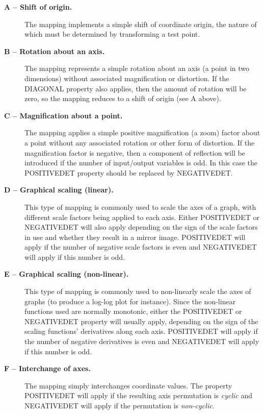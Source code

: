 \documentclass[twoside,11pt]{article}
\renewcommand{\_}{\texttt{\symbol{95}}}
\newcommand{\name}[1]{\mbox{\small{#1}}}
\begin{document}
\begin{description}

\item[\textbf{A -- Shift of origin.}] The mapping implements a simple shift of
coordinate origin, the nature of which must be determined by transforming a
test point.

\item[\textbf{B -- Rotation about an axis.}] The mapping represents a
simple rotation about an axis (a point in two dimensions) without
associated magnification or distortion.
If the \name{DIAGONAL} property also applies, then the amount of rotation
will be zero, so the mapping reduces to a shift of origin (see A above).

\item[\textbf{C -- Magnification about a point.}] The mapping applies a
simple positive magnification (a zoom) factor about a point without any
associated rotation or other form of distortion.
If the magnification factor is negative, then a component of reflection will
be introduced if the number of input/output variables is odd.
In this case the \name{POSITIVE\_DET} property should be replaced by
\name{NEGATIVE\_DET}.

\item[\textbf{D -- Graphical scaling (linear).}] This type of mapping is
commonly used to scale the axes of a graph, with different scale factors
being applied to each axis.
Either \name{POSITIVE\_DET} or \name{NEGATIVE\_DET} will also apply depending
on the sign of the scale factors in use and whether they result in a mirror
image.
\name{POSITIVE\_DET} will apply if the number of negative scale factors is
even and \name{NEGATIVE\_DET} will apply if this number is odd.

\item[\textbf{E -- Graphical scaling (non-linear).}] This type of mapping is
commonly used to non-linearly scale the axes of graphs (to produce a
log-log plot for instance).
Since the non-linear functions used are normally monotonic, either the
\name{POSITIVE\_DET} or \name{NEGATIVE\_DET} property will usually apply,
depending on the sign of the scaling functions' derivatives along each axis.
\name{POSITIVE\_DET} will apply if the number of negative derivatives is
even and \name{NEGATIVE\_DET} will apply if this number is odd.

\item[\textbf{F -- Interchange of axes.}] The mapping simply interchanges
coordinate values.
The property \name{POSITIVE\_DET} will apply if the resulting axis
permutation is \emph{cyclic} and \name{NEGATIVE\_DET} will apply if the
permutation is \emph{non-cyclic}.


\end{description}
\end{document}
